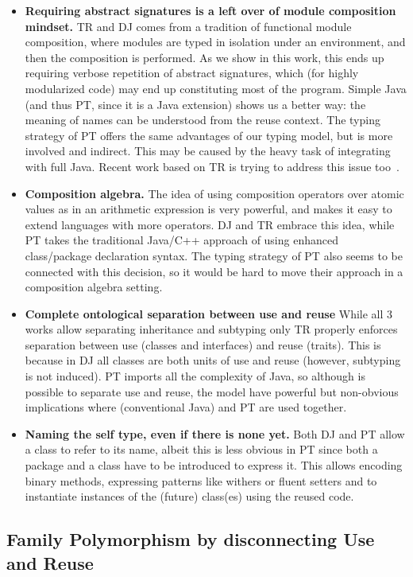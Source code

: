 \begin{itemize}
\item 
{\bf Requiring abstract signatures is a left over of module composition mindset.}
TR and DJ comes from a tradition of functional module composition, where 
modules are typed in isolation under an environment, and then the composition is performed.
As we show in this work, this ends up requiring verbose repetition of abstract signatures,
which (for highly modularized code) may end up constituting most of the program.
Simple Java (and thus PT, since it is a Java extension) shows us a better way:
the meaning of names can be understood from the reuse context.
The typing strategy of PT offers the same advantages of our typing model, 
but is more involved and indirect. This may be caused by the
heavy task of integrating with full Java.
Recent work based on TR is trying to address this issue too~\cite{damiani2017unified}.
\item {\bf Composition algebra.}
The idea of using composition operators over atomic values as in an arithmetic expression is very powerful,
and makes it easy to extend languages with more operators. DJ and TR embrace this idea, while PT takes the traditional Java/C++ approach of using enhanced class/package declaration syntax.
The typing strategy of PT also seems to be connected with this
decision, so it would be hard to move their approach in a composition
algebra setting.
\item {\bf Complete ontological separation between use and reuse}
While all 3 works allow separating inheritance and subtyping only TR properly enforces 
separation between use (classes and interfaces) and reuse (traits).
This is because in DJ all classes are both units of use and reuse (however, subtyping is not induced).
PT imports all the complexity of Java, so although is possible to separate use and reuse, the model have powerful but non-obvious implications where (conventional Java) \Q@extends@ and PT are used together.
\item {\bf Naming the self type, even if there is none yet.}
Both DJ and PT allow a class to refer to its name, albeit this is
less obvious in PT since both a package and a class have to be introduced to express it.
This allows encoding binary methods, expressing patterns like withers or fluent setters and to instantiate instances of the (future) class(es)  using the reused code.
\end{itemize}

\subsection{Family
Polymorphism by disconnecting Use and Reuse}

